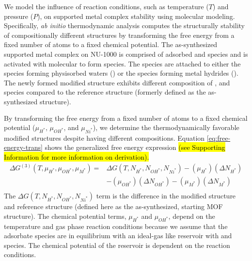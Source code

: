 \documentclass[journal=jctcce,manuscript=article]{achemso}
\begin{document}
We model the influence of reaction conditions, such as temperature ($T$) and pressure ($P$), on supported metal complex stability using molecular modeling. Specifically, \textit{ab initio} thermodynamic analysis computes the structurally stability of compositionally different structures by transforming the free energy from a fixed number of atoms to a fixed chemical potential. The as-synthesized supported metal complex on NU-1000 is comprised of adsorbed  and  species and is activated with molecular  to form  species. The  species are attached to either the  species forming physisorbed waters () or the  species forming metal hydrides (). The newly formed modified structure exhibits different composition of ,  and  species compared to the reference structure (formerly defined as the as-synthesized structure). 

By transforming the free energy from a fixed number of atoms to a fixed chemical potential ($\mu_{H^{*}}$, $\mu_{OH^{*}}$, and $\mu_{Ni^{*}}$), we determine the thermodynamically favorable modified structures despite having different compositions. Equation \ref{eq:free-energy-trans} shows the generalized free energy expression \hl{(see Supporting Information for more information on derivation).}
\begin{equation}
    \begin{split}
        \Delta G^{(3)}(T,\mu_{H^{*}},\mu_{OH^{*}},\mu_{M^{*}})  = & \Delta G(T,N_{H^{*}},N_{OH^{*}},N_{Ni^{*}}) - (\mu_{H^{*}})(\Delta N_{H^{*}}) \\
        & - (\mu_{OH^{*}})(\Delta N_{OH^{*}}) 
          - (\mu_{M^{*}})(\Delta N_{M^{*}}) \\ 
    \end{split}
    \label{eq:free-energy-trans}
\end{equation}
The $\Delta G(T,N_{H^{*}},N_{OH^{*}},N_{Ni^{*}})$ term is the difference in the modified structure and reference structure (defined here as the as-synthesized, starting MOF structure). The chemical potential terms,  $\mu_{H^{*}}$ and $\mu_{OH^{*}}$, depend on the temperature and gas phase reaction conditions because we assume that the adsorbate species are in equilibrium with an ideal-gas like reservoir with  and  species. The chemical potential of the reservoir is dependent on the reaction conditions. 
\end{document}
